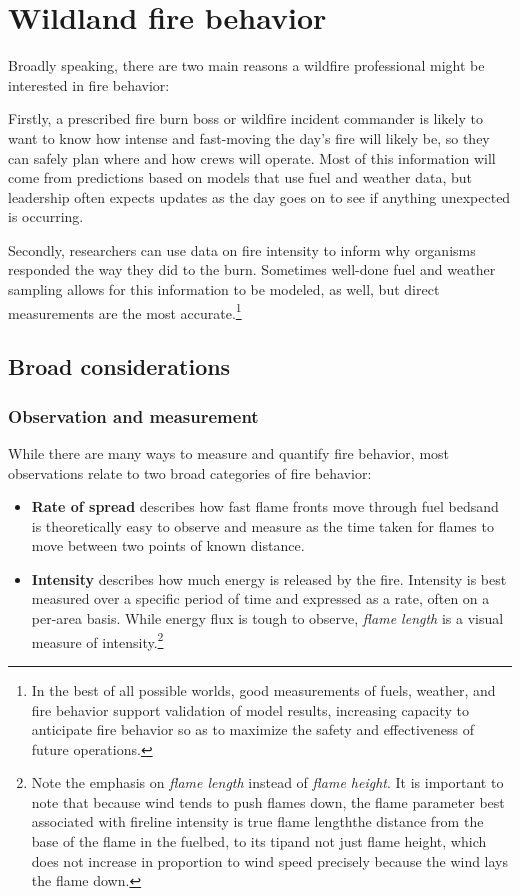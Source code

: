 \chapter{Wildland fire behavior} 
\label{ch:behavior}

Broadly speaking, there are two main reasons a wildfire professional might be interested in fire behavior: 

Firstly, a prescribed fire burn boss or wildfire incident commander is likely to want to know how intense and fast-moving the day's fire will likely be, so they can safely plan where and how crews will operate. 
Most of this information will come from predictions based on models that use fuel and weather data, but leadership often expects updates as the day goes on to see if anything unexpected is occurring. 

Secondly, researchers can use data on fire intensity to inform why organisms responded the way they did to the burn. 
Sometimes well-done fuel and weather sampling allows for this information to be modeled, as well, but direct measurements are the most accurate.\footnote{In the best of all possible worlds, good measurements of fuels, weather, and fire behavior support validation of model results, increasing capacity to anticipate fire behavior so as to maximize the safety and effectiveness of future operations.}

\section{Broad considerations}

\subsection{Observation and measurement}

While there are many ways to measure and quantify fire behavior, most observations relate to two broad categories of fire behavior: 

\begin{itemize}[noitemsep]
	\item \textbf{Rate of spread} describes how fast flame fronts move through fuel beds\textemdash and is theoretically easy to observe and measure as the time taken for flames to move between two points of known distance. 
	\item \textbf{Intensity} describes how much energy is released by the fire.  
	Intensity is best measured over a specific period of time and expressed as a rate, often on a per-area basis.
	While energy flux is tough to observe, \emph{flame length} is a visual measure of intensity.\footnote{Note the emphasis on \emph{flame length} instead of \emph{flame height}. It is important to note that because wind tends to push flames down, the flame parameter best associated with fireline intensity is true flame length\textemdash the distance from the base of the flame in the fuelbed, to its tip\textemdash and not just flame height, which does not increase in proportion to wind speed precisely because the wind lays the flame down.} 
\end{itemize}

